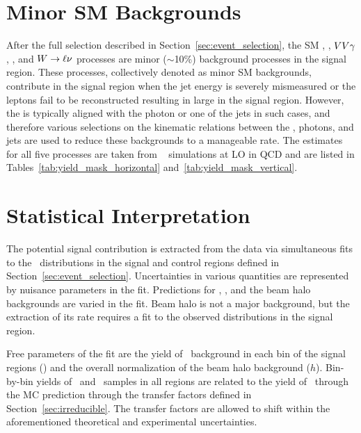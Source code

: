 

\section{Minor SM Backgrounds}
\label{sec:minorsm}

After the full selection described in Section~\ref{sec:event_selection}, the SM \gj, \ttg, $VV\gamma$, \zllg, and ${W}\to\ell\nu$ processes are minor ($\sim$10\%) background processes in the signal region. 
These processes, collectively denoted as minor SM backgrounds, contribute in the signal region when the jet energy is severely mismeasured or the leptons fail to be reconstructed resulting in large \met in the signal region. 
However, the \met is typically aligned with the photon or one of the jets in such cases, and therefore various selections on the kinematic relations between the \met, photons, and jets are used to reduce these backgrounds to a manageable rate. 
The estimates for all five processes are taken from \MGvATNLO~\cite{} simulations at LO in QCD and are listed in Tables~\ref{tab:yield_mask_horizontal} and~\ref{tab:yield_mask_vertical}.

\section{Statistical Interpretation}
\label{sec:interpretation}

The potential signal contribution is extracted from the data via simultaneous fits to the
\ETg\ distributions in the signal and control regions defined in Section~\ref{sec:event_selection}. 
Uncertainties in various quantities are represented by nuisance parameters in the fit. 
Predictions for \zinvg, \wlng, and the beam halo backgrounds are varied in the fit. 
Beam halo is not a major background, but the extraction of its rate requires a fit to the observed distributions in the signal region.

Free parameters of the fit are the yield of \zinvg\ background in each bin of the signal regions (\NZg[i]) and the overall normalization of the beam halo background ($h$). 
Bin-by-bin yields of \wlng\ and \zllg\ samples in all regions are related to the yield of \zinvg\ through the MC prediction through the transfer factors defined in Section~\ref{sec:irreducible}. 
The transfer factors are allowed to shift within the aforementioned theoretical and experimental uncertainties.

